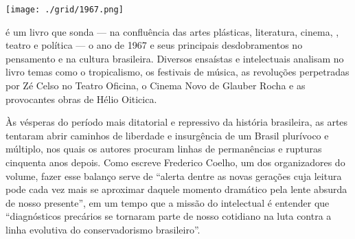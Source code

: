 \vfill

\hspace*{-.4cm}\begin{minipage}[c]{.5\linewidth}
\small{
{}}
\end{minipage}


\pagebreak %


\begin{center}
\hspace*{.5cm}\texttt{[image: ./grid/1967.png]}
\end{center}

\hspace*{-7cm}\hrulefill\hspace*{-7cm}

\medskip

 é um livro que sonda --- na confluência das artes plásticas, literatura, cinema, , teatro e política --- o ano de 1967 e seus principais desdobramentos no pensamento e na cultura brasileira. Diversos ensaístas e intelectuais analisam no livro temas como o tropicalismo, os festivais de música, as revoluções perpetradas por Zé Celso no Teatro Oficina, o Cinema Novo de Glauber Rocha e as provocantes obras de Hélio Oiticica.

Às vésperas do período mais ditatorial e repressivo da história brasileira, as artes tentaram abrir  caminhos de liberdade e insurgência de um Brasil plurívoco e múltiplo, nos quais os autores procuram linhas de permanências e rupturas cinquenta anos depois. Como escreve Frederico Coelho, um dos organizadores do volume, fazer esse balanço serve de “alerta dentre as novas gerações cuja leitura pode cada vez mais se aproximar daquele momento dramático pela lente absurda de nosso presente”, em um tempo que a missão do intelectual é entender que “diagnósticos precários se tornaram parte de nosso cotidiano na luta contra a linha evolutiva do conservadorismo brasileiro”.


